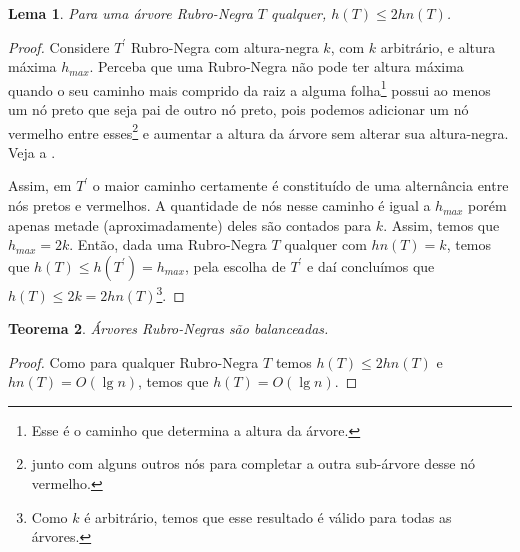 \documentclass[11pt,twoside]{article}
\newtheorem{theorem}{Teorema}[section]
\newtheorem{lemma}[theorem]{Lema}
\theoremstyle{definition}
\begin{document}
\begin{lemma}
	Para uma árvore Rubro-Negra \( T \) qualquer, \( h(T) \leq 2 hn(T) \).
\end{lemma}
\begin{proof}
	Considere \( T^\prime \) Rubro-Negra com altura-negra \( k \), com \( k \) arbitrário, e altura máxima \( h_{max} \). Perceba que uma Rubro-Negra não pode ter altura máxima quando o seu caminho mais comprido da raiz a alguma folha\footnote{Esse é o caminho que determina a altura da árvore.} possui ao menos um nó preto que seja pai de outro nó preto, pois podemos adicionar um nó vermelho entre esses\footnote{junto com alguns outros nós para completar a outra sub-árvore desse nó vermelho.} e aumentar a altura da árvore sem alterar sua altura-negra. Veja a .

	\begin{figure}[htb]
		\caption{\label{fig:rn-h-max}}
		\centering
		
	\end{figure}

	Assim, em \( T^\prime \) o maior caminho certamente é constituído de uma alternância entre nós pretos e vermelhos. A quantidade de nós nesse caminho é igual a \( h_{max} \) porém apenas metade (aproximadamente) deles são contados para \( k \). Assim, temos que \( h_{max} = 2 k \). Então, dada uma Rubro-Negra \( T \) qualquer com \( hn(T) = k \), temos que \( h(T) \leq h(T^\prime) = h_{max} \), pela escolha de \( T^\prime \) e daí concluímos que \( h(T) \leq 2k = 2hn(T) \)\footnote{Como \( k \) é arbitrário, temos que esse resultado é válido para todas as árvores.}.
\end{proof}

\begin{theorem}
	Árvores Rubro-Negras são balanceadas.
\end{theorem}
\begin{proof}
	Como para qualquer Rubro-Negra \( T \) temos \( h(T) \leq 2 hn(T) \) e \( hn(T) = O(\lg n) \), temos que \( h(T) = O(\lg n) \).
\end{proof}

\printbibliography
\end{document}
